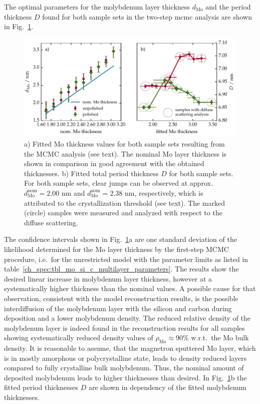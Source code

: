 The optimal parameters for the molybdenum layer thickness $d_\text{Mo}$ and the period thickness $D$ found for both sample sets in the two-step \gls{mcmc} analysis are shown in Fig.~\ref{ch_spec:fig_MoSi_fitted_mo_and_fitted_D}.
\begin{figure}[htbp]
\centering
\includegraphics[width=\textwidth]{img/fitted_mo_and_fitted_D}
\caption{a) Fitted Mo thickness values for both sample sets resulting from the MCMC analysis (see text). The nominal Mo layer thickness is shown in comparison in good agreement with the obtained thicknesses. b) Fitted total period thickness $D$ for both sample sets. For both sample sets, clear jumps can be observed at approx.~$d^\text{nom}_\text{Mo} =2.00$ nm and $d^\text{nom}_\text{Mo} =2.38$ nm, respectively, which is attributed to the crystallization threshold (see text). The marked (circle) samples were measured and analyzed with respect to the diffuse scattering.}
\label{ch_spec:fig_MoSi_fitted_mo_and_fitted_D}
\end{figure}
The confidence intervals shown in Fig.~\ref{ch_spec:fig_MoSi_fitted_mo_and_fitted_D}a are one standard deviation of the likelihood determined for the Mo layer thickness by the first-step MCMC procedure, i.e.~for the unrestricted model with the parameter limits as listed in table~\ref{ch_spec:tbl_mo_si_c_multilayer_parameters}. The results show the desired linear increase in molybdenum layer thickness, however at a systematically higher thickness than the nominal values. A possible cause for that observation, consistent with the model reconstruction results, is the possible interdiffusion of the molybdenum layer with the silicon and carbon during deposition and a lower molybdenum density. The reduced relative density of the molybdenum layer is indeed found in the reconstruction results for all samples showing systematically reduced density values of $\rho_\text{Mo} \approx 90\%$ w.r.t.~the Mo bulk density. It is reasonable to assume, that the magnetron sputtered Mo layer, which is in mostly amorphous or polycrystalline state, leads to density reduced layers compared to fully crystalline bulk molybdenum. Thus, the nominal amount of deposited molybdenum leads to higher thicknesses than desired. In Fig.~\ref{ch_spec:fig_MoSi_fitted_mo_and_fitted_D}b the fitted period thicknesses $D$ are shown in dependency of the fitted molybdenum thicknesses.

